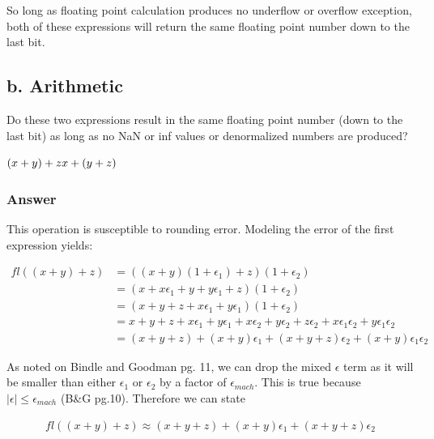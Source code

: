 \documentclass{article}
\newcommand{\n}{\newline}
\begin{document}
	So long as floating point calculation produces no underflow or overflow exception, both of these expressions will return the same floating point number down to the last bit. 
	
	\subsection{b. Arithmetic}
	Do these two expressions result in the same floating point number (down to the last bit) as long as no NaN or inf values or denormalized numbers are produced? \n
	
	\begin{flushleft}
	\begin{math}
	(x+y)+z\n
	x+(y+z)
	\end{math}
	\end{flushleft}
	
	\subsubsection{Answer}
	This operation is susceptible to rounding error.  Modeling the error of the first expression yields:
	
	\begin{equation}
		\begin{split}
		fl((x+y)+z)&=((x+y)(1+\epsilon_{1})+z)(1+\epsilon_{2})\\
		&=(x+x\epsilon_{1}+y+y\epsilon_{1}+z)(1+\epsilon_{2})\\
		&=(x+y+z+x\epsilon_{1}+y\epsilon_{1})(1+\epsilon_{2})\\
		&=x+y+z+x\epsilon_{1}+y\epsilon_{1}+x\epsilon_{2}+y\epsilon_{2}+z\epsilon_{2}+x\epsilon_{1}\epsilon_{2}+y\epsilon_{1}\epsilon_{2}\\
		&=(x+y+z)+(x+y)\epsilon_{1}+(x+y+z)\epsilon_{2}+(x+y)\epsilon_{1}\epsilon_{2}
		\end{split}
	\end{equation}
	
	As noted on Bindle and Goodman pg. 11, we can drop the mixed $\epsilon$ term as it will be smaller than either $\epsilon_{1}$ or $\epsilon_{2}$ by a factor of $\epsilon_{mach}$.  This is true because $|\epsilon|\leq\epsilon_{mach}$ (B\&G pg.10).  Therefore we can state
	
	\begin{equation}
		\begin{split}
		fl((x+y)+z)\approx(x+y+z)+(x+y)\epsilon_{1}+(x+y+z)\epsilon_{2}
		\end{split}
	\end{equation}
	
\end{document}
